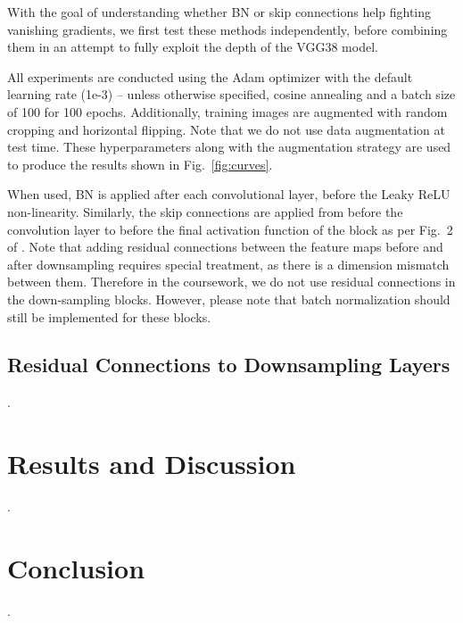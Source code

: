 \documentclass{article}
\begin{document}
With the goal of understanding whether BN or skip connections
help fighting vanishing gradients, we first test these
methods independently, before combining them in an attempt
to fully exploit the depth of the VGG38 model.

All experiments are conducted using the Adam optimizer with the default
learning rate (1e-3) -- unless otherwise specified, cosine annealing and a batch size of 100
for 100 epochs. 
Additionally, training images are augmented with random 
cropping and horizontal flipping.
Note that we do not use data augmentation at test time.
These hyperparameters along with the augmentation strategy are used
to produce the results shown in Fig.~\ref{fig:curves}.

When used, BN is applied
after each convolutional layer, before the Leaky
ReLU non-linearity. 
Similarly, the skip connections are applied from 
before the convolution layer to before the final activation function
of the block as per Fig.~2 of \cite{he2016deep}. 
Note that adding residual connections between the feature maps before and after downsampling requires special treatment, as there is a dimension mismatch between them. 
Therefore in the coursework, we do not use residual connections in the down-sampling blocks. However, please note that batch normalization should still be implemented for these blocks. 

\subsection{Residual Connections to Downsampling Layers}
\label{subsec:rescimp}

\questionThree.


\section{Results and Discussion}
\label{sec:disc}

\questionFour.

\section{Conclusion}
\label{sec:concl}

\questionFive.    


\end{document}
